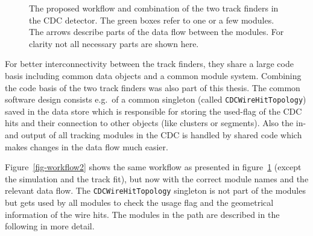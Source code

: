 \begin{figure}
  \centering
 \caption[Proposed workflow in the CDC tracking]{The proposed workflow and combination of the two track finders in the CDC detector. The green boxes refer to one or a few modules. The arrows describe parts of the data flow between the modules. For clarity not all necessary parts are shown here.}
 \label{fig-workflow}
\end{figure}

For better interconnectivity between the track finders, they share a large code basis including common data objects and a common module system. Combining the code basis of the two track finders was also part of this thesis. The common software design consists e.g.\ of a common singleton (called \texttt{CDCWireHitTopology}) saved in the data store which is responsible for storing the used-flag of the CDC hits and their connection to other objects (like clusters or segments). Also the in- and output of all tracking modules in the CDC is handled by shared code which makes changes in the data flow much easier.

Figure~\ref{fig-workflow2} shows the same workflow as presented in figure~\ref{fig-workflow} (except the simulation and the track fit), but now with the correct module names and the relevant data flow. The \texttt{CDCWireHitTopology} singleton is not part of the modules but gets used by all modules to check the usage flag and the geometrical information of the wire hits. The modules in the path are described in the following in more detail.

